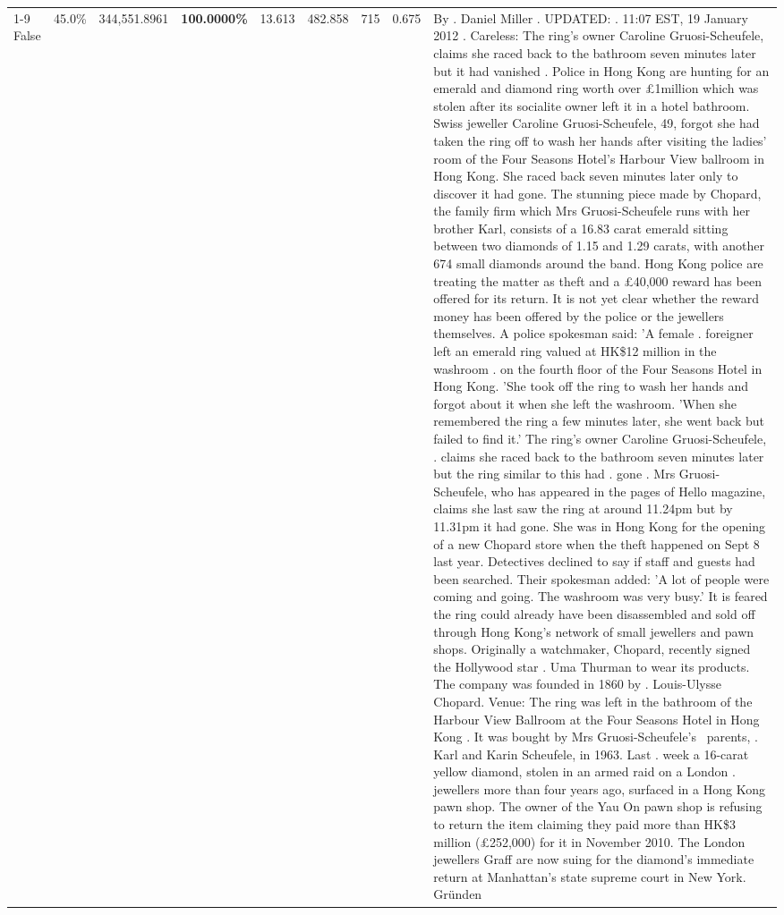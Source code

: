 \begin{table}[H]
\begin{tabular}{lllrlllll}
\cline{1-9}
False & 45.0\% & 344,551.8961 & \bfseries \color{red} 100.0000\% & 13.613 & 482.858 & 715 & 0.675 & By . Daniel Miller . UPDATED: . 11:07 EST, 19 January 2012 . Careless: The ring's owner Caroline Gruosi-Scheufele, claims she raced back to the bathroom seven minutes later but it had vanished . Police in Hong Kong are hunting for an emerald and diamond ring worth over £1million which was stolen after its socialite owner left it in a hotel bathroom. Swiss jeweller Caroline Gruosi-Scheufele, 49, forgot she had taken the ring off to wash her hands after visiting the ladies' room of the Four Seasons Hotel's Harbour View ballroom in Hong Kong. She raced back seven minutes later only to discover it had gone. The stunning piece made by Chopard, the family firm which Mrs Gruosi-Scheufele runs with her brother Karl, consists of a 16.83 carat emerald sitting between two diamonds of 1.15 and 1.29 carats, with another 674 small diamonds around the band. Hong Kong police are treating the matter as theft and a £40,000 reward has been offered for its return. It is not yet clear whether the reward money has been offered by the police or the jewellers themselves. A police spokesman said: 'A female . foreigner left an emerald ring valued at HK\$12 million in the washroom . on the fourth floor of the Four Seasons Hotel in Hong Kong. 'She took off the ring to wash her hands and forgot about it when she left the washroom. 'When she remembered the ring a few minutes later, she went back but failed to find it.' The ring's owner Caroline Gruosi-Scheufele, . claims she raced back to the bathroom seven minutes later but the ring similar to this had . gone . Mrs Gruosi-Scheufele, who has appeared in the pages of Hello magazine, claims she last saw the ring at around 11.24pm but by 11.31pm it had gone. She was in Hong Kong for the opening of a new Chopard store when the theft happened on Sept 8 last year. Detectives declined to say if staff and guests had been searched. Their spokesman added: 'A lot of people were coming and going. The washroom was very busy.' It is feared the ring could already have been disassembled and sold off through Hong Kong's network of small jewellers and pawn shops. Originally a watchmaker, Chopard, recently signed the Hollywood star . Uma Thurman to wear its products. The company was founded in 1860 by . Louis-Ulysse Chopard. Venue: The ring was left in the bathroom of the Harbour View Ballroom at the Four Seasons Hotel in Hong Kong . It was bought by Mrs Gruosi-Scheufele's  parents, . Karl and Karin Scheufele, in 1963. Last . week a 16-carat yellow diamond, stolen in an armed raid on a London . jewellers more than four years ago, surfaced in a Hong Kong pawn shop. The owner of the Yau On pawn shop is refusing to return the item claiming they paid more than HK\$3 million (£252,000) for it in November 2010. The London jewellers Graff are now suing for the diamond’s immediate return at Manhattan’s state supreme court in New York. Gründen \\

\end{tabular}
\end{table}
